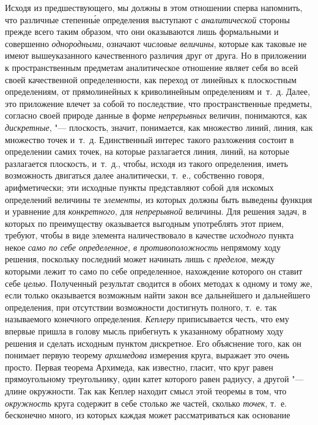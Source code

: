 Исходя из предшествующего, мы должны в этом отношении сперва напомнить, что
различные степенн\'{ы}е определения выступают с {\em аналитической} стороны
прежде всего таким образом, что они оказываются лишь формальными и совершенно
{\em однородными}, означают {\em числовые величины}, которые как таковые не
имеют вышеуказанного качественного различия друг от друга. Но в приложении к
пространственным предметам аналитическое отношение являет себя во всей своей
качественной определенности, как переход от линейных к плоскостным
определениям, от прямолинейных к криволинейным определениям и~т.~д. Далее, это
приложение влечет за собой то последствие, что пространственные предметы,
согласно своей природе данные в форме {\em непрерывных} величин, понимаются,
как {\em дискретные}, "--- плоскость, значит, понимается, как множество линий,
линия, как множество точек и~т.~д. Единственный интерес такого разложения
состоит в определении самих точек, на которые разлагается линия, линий, на
которые разлагается плоскость, и~т.~д., чтобы, исходя из такого определения,
иметь возможность двигаться далее аналитически, т.~е., собственно говоря,
арифметически; эти исходные пункты представляют собой для искомых определений
величины те {\em элементы}, из которых должны быть выведены функция и уравнение
для {\em конкретного}, для {\em непрерывной} величины. Для решения задач, в
которых по преимуществу оказывается выгодным употреблять этот прием, требуют,
чтобы в виде элемента наличествовало в качестве {\em исходного} пункта некое
{\em само по себе определенное, в противоположность} непрямому ходу
решения, поскольку последний может начинать лишь с {\em пределов}, между
которыми лежит то само по себе определенное, нахождение которого он ставит себе
{\em целью}. Полученный результат сводится в обоих методах к одному и тому же,
если только оказывается возможным найти закон все дальнейшего и дальнейшего
определения, при отсутствии возможности достигнуть полного, т.~е. так
называемого конечного определения. {\em Кеплеру} приписывается честь, что ему
впервые пришла в голову мысль прибегнуть к указанному обратному ходу решения и
сделать исходным пунктом дискретное. Его объяснение того, как он понимает
первую теорему {\em архимедова} измерения круга, выражает это очень просто.
Первая теорема Архимеда, как известно, гласит, что круг равен прямоугольному
треугольнику, один катет которого равен радиусу, а другой "--- длине
окружности. Так как Кеплер находит смысл этой теоремы в том, что
{\em окружность} круга содержит в себе столько же частей, сколько {\em точек},
т.~е. бесконечно много, из которых каждая может рассматриваться как основание

